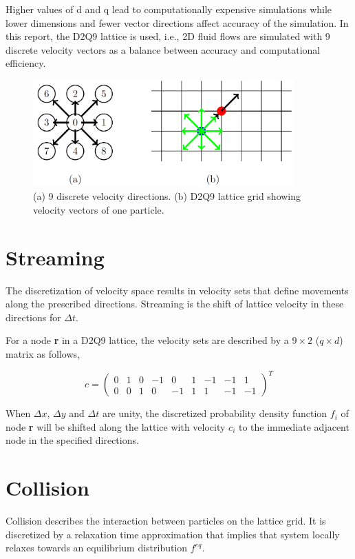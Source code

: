 \documentclass[a4paper,11pt]{report}
\begin{document}
Higher values of d and q lead to computationally expensive simulations while lower dimensions and fewer vector directions affect accuracy of the simulation. In this report, the D2Q9 lattice is used, i.e., 2D fluid flows are simulated with 9 discrete velocity vectors as a balance between accuracy and computational efficiency.

\begin{figure}[h!]
  \begin{center}
   \includegraphics[width=10cm]{logos/Gitter_LBM.png}
   \caption{(a) 9 discrete velocity directions. (b) D2Q9 lattice grid showing velocity vectors of one particle. \cite{Pastewka2019HPCWP}}
  \label{fig:mesh}
  \end{center}
\end{figure} 

\section{Streaming}
\label{sec:streaming}
The discretization of velocity space results in velocity sets that define movements along the prescribed directions. Streaming is the shift of lattice velocity in these directions for $\Delta t$. 

For a node \textbf{r} in a D2Q9 lattice, the velocity sets are described by a $9\times 2$ ($q\times d$) matrix as follows,

\begin{equation}
c =  \begin{pmatrix}
 0 & 1 & 0 & -1 & 0 & 1 & -1 & -1 & 1\\
 0 & 0 & 1 & 0 & -1 & 1 & 1 & -1 & -1
 \end{pmatrix} ^{T} 
\end{equation}

When $\Delta x$, $\Delta y$ and $\Delta t$ are unity, the discretized probability density function $f_i$ of node \textbf{r} will be shifted along the lattice with velocity $c_i$ to the immediate adjacent node in the specified directions.

\section{Collision}
\label{sec:collision}
Collision describes the interaction between particles on the lattice grid. It is discretized by a relaxation time approximation that implies that system locally relaxes towards an equilibrium distribution $f^{eq}$.
\end{document}
